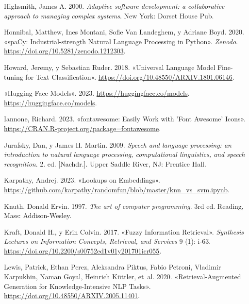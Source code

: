 \documentclass[
  12pt,
  openany]{book}
\newlength{\cslhangindent}
\newlength{\cslentryspacingunit} %
\newenvironment{CSLReferences}[2] %
 {%
  \setlength{\parindent}{0pt}
  \ifodd #1
  \let\oldpar\par
  \def\par{\hangindent=\cslhangindent\oldpar}
  \fi
  \setlength{\parskip}{#2\cslentryspacingunit}
 }%
 {}
\begin{document}
\begin{CSLReferences}{1}{0}
\leavevmode{}%
Highsmith, James A. 2000. \emph{Adaptive software development: a collaborative approach to managing complex systems}. New York: Dorset House Pub.

\leavevmode{}%
Honnibal, Matthew, Ines Montani, Sofie Van Landeghem, y Adriane Boyd. 2020. {«spaCy: Industrial-strength Natural Language Processing in Python»}. \emph{Zenodo}. \url{https://doi.org/10.5281/zenodo.1212303}.

\leavevmode{}%
Howard, Jeremy, y Sebastian Ruder. 2018. {«Universal Language Model Fine-tuning for Text Classification»}. \url{https://doi.org/10.48550/ARXIV.1801.06146}.

\leavevmode{}%
{«Hugging Face Models»}. 2023. \url{https://huggingface.co/models}. \url{https://huggingface.co/models}.

\leavevmode{}%
Iannone, Richard. 2023. {«fontawesome: Easily Work with 'Font Awesome' Icons»}. \url{https://CRAN.R-project.org/package=fontawesome}.

\leavevmode{}%
Jurafsky, Dan, y James H. Martin. 2009. \emph{Speech and language processing: an introduction to natural language processing, computational linguistics, and speech recognition}. 2. ed. {[}Nachdr.{]}. Upper Saddle River, NJ: Prentice Hall.

\leavevmode{}%
Karpathy, Andrej. 2023. {«Lookups on Embeddings»}. \url{https://github.com/karpathy/randomfun/blob/master/knn_vs_svm.ipynb}.

\leavevmode{}%
Knuth, Donald Ervin. 1997. \emph{The art of computer programming}. 3rd ed. Reading, Mass: Addison-Wesley.

\leavevmode{}%
Kraft, Donald H., y Erin Colvin. 2017. {«Fuzzy Information Retrieval»}. \emph{Synthesis Lectures on Information Concepts, Retrieval, and Services} 9 (1): i-63. \url{https://doi.org/10.2200/s00752ed1v01y201701icr055}.

\leavevmode{}%
Lewis, Patrick, Ethan Perez, Aleksandra Piktus, Fabio Petroni, Vladimir Karpukhin, Naman Goyal, Heinrich Küttler, et~al. 2020. {«Retrieval-Augmented Generation for Knowledge-Intensive NLP Tasks»}. \url{https://doi.org/10.48550/ARXIV.2005.11401}.


\end{CSLReferences}
\end{document}
